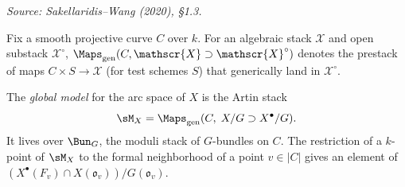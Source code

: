 \begin{definition}
  \label{def:global-model}
%
  \textit{Source: Sakellaridis--Wang (2020), §1.3.}

  Fix a smooth projective curve \( C \) over \( k \).
  For an algebraic stack \( \mathscr{X} \) and open substack \( \mathscr{X}^\circ \),
  \( \Maps_{\mathrm{gen}}(C, \mathscr{X} \supset \mathscr{X}^\circ) \) denotes the
  prestack of maps \( C \times S \to \mathscr{X} \) (for test schemes \( S \)) that
  generically land in \( \mathscr{X}^\circ \).

  The \emph{global model} for the arc space of \( X \) is the Artin stack
  \[
    \sM_X = \Maps_{\mathrm{gen}}(C,\; X/G \supset X^\bullet/G).
  \]
  It lives over \( \Bun_G \), the moduli stack of \( G \)-bundles on \( C \).
  The restriction of a \( k \)-point of \( \sM_X \) to the formal neighborhood of
  a point \( v \in |C| \) gives an element of
  \( (X^\bullet(F_v) \cap X(\mathfrak{o}_v))/G(\mathfrak{o}_v) \).
\end{definition}

